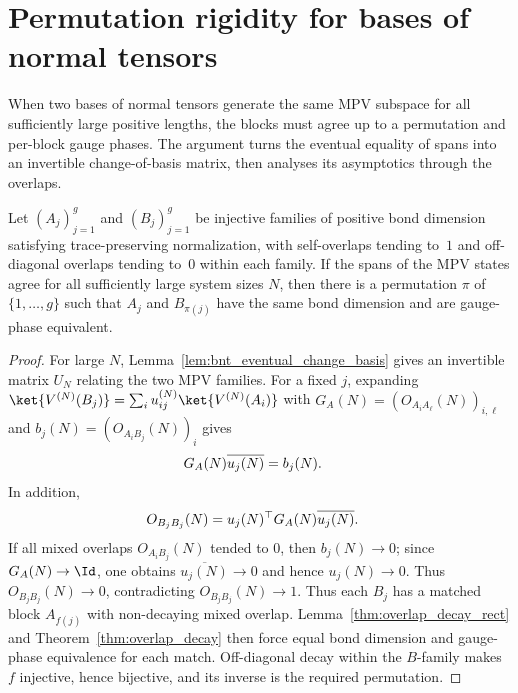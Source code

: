 \section{Permutation rigidity for bases of normal tensors}

When two bases of normal tensors generate the same MPV subspace for all
sufficiently large positive lengths, the blocks must agree up to a permutation
and per-block gauge phases. The argument turns the eventual equality of spans
into an invertible change-of-basis matrix, then analyses its asymptotics through
the overlaps.

\begin{lemma}
    \label{thm:bnt_perm_same_card}
    \leanok
    Let $(A_j)_{j=1}^g$ and $(B_j)_{j=1}^g$ be injective families of positive
    bond dimension satisfying trace-preserving normalization, with self-overlaps tending to~$1$ and
    off-diagonal overlaps tending to~$0$ within each family. If the spans of
    the MPV states agree for all sufficiently large system sizes $N$, then
    there is a permutation $\pi$ of $\{1, \ldots, g\}$ such that $A_j$ and
    $B_{\pi(j)}$ have the same bond dimension and are gauge-phase equivalent.
\end{lemma}

\begin{proof}\leanok{}
    For large $N$, Lemma~\ref{lem:bnt_eventual_change_basis} gives an
    invertible matrix $U_N$ relating the two MPV families. For a fixed $j$,
    expanding $\ket{V^{(N)}(B_j)}=\sum_i u_{ij}^{(N)}\ket{V^{(N)}(A_i)}$ with
    $G_A(N)=(O_{A_iA_\ell}(N))_{i,\ell}$ and
    $b_j(N)=(O_{A_iB_j}(N))_i$ gives
    \begin{align}
        G_A(N)\overline{u_j(N)}
         & =b_j(N).
        \notag
    \end{align}
    In addition,
    \begin{align}
        O_{B_jB_j}(N)
         & =u_j(N)^{\top}G_A(N)\overline{u_j(N)}.
        \notag
    \end{align}
    If all mixed overlaps $O_{A_iB_j}(N)$ tended to $0$, then
    $b_j(N)\to0$; since $G_A(N)\to\Id$, one obtains
    $\overline{u_j(N)}\to0$ and hence $u_j(N)\to0$. Thus
    $O_{B_jB_j}(N)\to0$, contradicting $O_{B_jB_j}(N)\to1$.
    Thus each $B_j$ has a matched block $A_{f(j)}$ with non-decaying mixed
    overlap. Lemma~\ref{thm:overlap_decay_rect}
    and Theorem~\ref{thm:overlap_decay} then force equal bond dimension and
    gauge-phase equivalence for each match. Off-diagonal decay within the
    $B$-family makes $f$ injective, hence bijective, and its inverse is the
    required permutation.
\end{proof}

